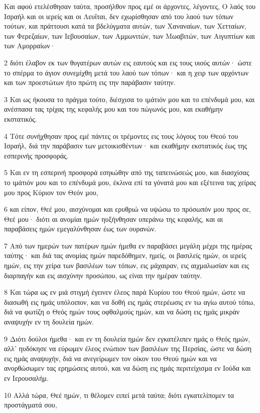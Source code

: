 \par Και αφού ετελέσθησαν ταύτα, προσήλθον προς εμέ οι άρχοντες, λέγοντες, Ο λαός του Ισραήλ και οι ιερείς και οι Λευΐται, δεν εχωρίσθησαν από του λαού των τόπων τούτων, και πράττουσι κατά τα βδελύγματα αυτών, των Χαναναίων, των Χετταίων, των Φερεζαίων, των Ιεβουσαίων, των Αμμωνιτών, των Μωαβιτών, των Αιγυπτίων και των Αμορραίων·
\par 2 διότι έλαβον εκ των θυγατέρων αυτών εις εαυτούς και εις τους υιούς αυτών· ώστε το σπέρμα το άγιον συνεμίχθη μετά του λαού των τόπων· και η χειρ των αρχόντων και των προεστώτων ήτο πρώτη εις την παράβασιν ταύτην.
\par 3 Και ως ήκουσα το πράγμα τούτο, διέσχισα το ιμάτιόν μου και το επένδυμά μου, και ανέσπασα τας τρίχας της κεφαλής μου και του πώγωνός μου, και εκαθήμην εκστατικός.
\par 4 Τότε συνήχθησαν προς εμέ πάντες οι τρέμοντες εις τους λόγους του Θεού του Ισραήλ, διά την παράβασιν των μετοικισθέντων· και εκαθήμην εκστατικός έως της εσπερινής προσφοράς.
\par 5 Και εν τη εσπερινή προσφορά εσηκώθην από της ταπεινώσεώς μου, και διασχίσας το ιμάτιόν μου και το επένδυμά μου, έκλινα επί τα γόνατά μου και εξέτεινα τας χείρας μου προς Κύριον τον Θεόν μου,
\par 6 και είπον, Θεέ μου, αισχύνομαι και ερυθριώ να υψώσω το πρόσωπόν μου προς σε, Θεέ μου· διότι αι ανομίαι ημών ηυξήνθησαν υπεράνω της κεφαλής, και αι παραβάσεις ημών εμεγαλύνθησαν έως των ουρανών.
\par 7 Από των ημερών των πατέρων ημών ήμεθα εν παραβάσει μεγάλη μέχρι της ημέρας ταύτης· και διά τας ανομίας ημών παρεδόθημεν, ημείς, οι βασιλείς ημών, οι ιερείς ημών, εις την χείρα των βασιλέων των τόπων, εις μάχαιραν, εις αιχμαλωσίαν και εις διαρπαγήν και εις αισχύνην προσώπου, ως είναι την ημέραν ταύτην.
\par 8 Και τώρα ως εν μιά στιγμή έγεινεν έλεος παρά Κυρίου του Θεού ημών, ώστε να διασωθή εις ημάς υπόλοιπον, και να δοθή εις ημάς στερέωσις εν τω αγίω αυτού τόπω, διά να φωτίζη ο Θεός ημών τους οφθαλμούς ημών, και να δώση εις ημάς μικράν αναψυχήν εν τη δουλεία ημών.
\par 9 Διότι δούλοι ήμεθα· και εν τη δουλεία ημών δεν εγκατέλιπεν ημάς ο Θεός ημών, αλλ' ηυδόκησε να εύρωμεν έλεος ενώπιον των βασιλέων της Περσίας, ώστε να δώση εις ημάς αναψυχήν, διά να ανεγείρωμεν τον οίκον του Θεού ημών και να ανορθώσωμεν τας ερημώσεις αυτού, και να δώση εις ημάς περιτείχισμα εν Ιούδα και εν Ιερουσαλήμ.
\par 10 Αλλά τώρα, Θεέ ημών, τι θέλομεν ειπεί μετά ταύτα; διότι εγκατελίπομεν τα προστάγματά σου,
